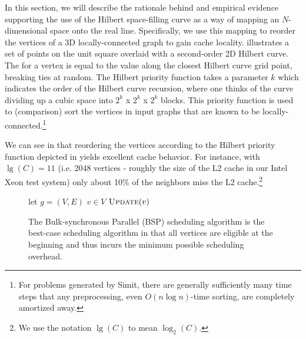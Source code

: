 In this section, we will describe the rationale behind and
empirical evidence supporting the use of the
Hilbert space-filling curve as a way of mapping an $N$-dimensional
space onto the real line.  Specifically, we use this mapping
to reorder the vertices of a 3D locally-connected graph to gain cache
locality.   illustrates a set of points
on the unit square overlaid with a second-order 2D Hilbert curve.
The  for a vertex is equal to the value along
the closest Hilbert curve grid point, breaking ties at random.  The
Hilbert priority function takes a parameter $k$ which indicates
the order of the Hilbert curve recursion, where one thinks of the
curve dividing up a cubic space into $2^k$ x $2^k$ x $2^k$ blocks.  This
priority function is used to (comparison) sort the vertices in input graphs
that are known to be locally-connected.\footnote{For problems generated
by Simit, there are generally sufficiently many time steps that any
preprocessing, even $O(n \log n)$-time sorting, are completely 
amortized away.}

We can see in  that reordering the vertices
according to the Hilbert priority function depicted in 
yields excellent cache behavior.  For instance, with $\lg (C) = 11$
(i.e. 2048 vertices - roughly the size of the L2 cache in our
Intel Xeon test system) only about 10\% of the neighbors miss the
L2 cache.\footnote{We use the notation $\lg (C)$ to mean $\log_2 (C)$.}



\begin{figure}
\centering
\begin{codebox*}
	\li 	let $g=(V,E)$
	\li 	\Parfor $v \in V$
	\li 		$\textnormal{\scshape Update}(v)$
		  	\End
\end{codebox*}
\caption{The Bulk-synchronous Parallel (BSP) scheduling algorithm
is the best-case scheduling algorithm in that all vertices are
eligible at the beginning and thus  incurs the minimum
possible scheduling overhead.}
\label{fig:bsp_code}
\end{figure}



